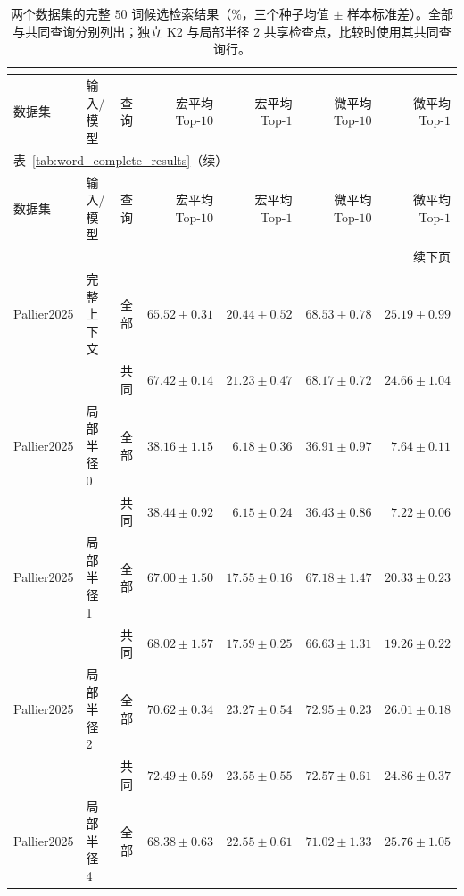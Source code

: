 \begingroup
\papertablestyle
\begin{longtable}{@{}lllrrrr@{}}
\caption{两个数据集的完整 $50$ 词候选检索结果（\%，三个种子均值 $\pm$ 样本标准差）。全部与共同查询分别列出；独立 K2 与局部半径 $2$ 共享检查点，比较时使用其共同查询行。}
\label{tab:word_complete_results}\label{tab:word_complete_pallier}\label{tab:word_complete_chinese}\\
\toprule
数据集 & 输入/模型 & 查询 & \shortstack{宏平均\\Top-$10$} & \shortstack{宏平均\\Top-$1$} & \shortstack{微平均\\Top-$10$} & \shortstack{微平均\\Top-$1$} \\
\midrule
\endfirsthead
\multicolumn{7}{l}{表~\ref{tab:word_complete_results}（续）}\\
\toprule
数据集 & 输入/模型 & 查询 & \shortstack{宏平均\\Top-$10$} & \shortstack{宏平均\\Top-$1$} & \shortstack{微平均\\Top-$10$} & \shortstack{微平均\\Top-$1$} \\
\midrule
\endhead
\midrule\multicolumn{7}{r}{续下页}\\\endfoot
\bottomrule\endlastfoot
Pallier2025 & 完整上下文 & 全部 & $65.52\pm0.31$ & $20.44\pm0.52$ & $68.53\pm0.78$ & $25.19\pm0.99$ \\
 &  & 共同 & $67.42\pm0.14$ & $21.23\pm0.47$ & $68.17\pm0.72$ & $24.66\pm1.04$ \\
\addlinespace
Pallier2025 & 局部半径 0 & 全部 & $38.16\pm1.15$ & $6.18\pm0.36$ & $36.91\pm0.97$ & $7.64\pm0.11$ \\
 &  & 共同 & $38.44\pm0.92$ & $6.15\pm0.24$ & $36.43\pm0.86$ & $7.22\pm0.06$ \\
\addlinespace
Pallier2025 & 局部半径 1 & 全部 & $67.00\pm1.50$ & $17.55\pm0.16$ & $67.18\pm1.47$ & $20.33\pm0.23$ \\
 &  & 共同 & $68.02\pm1.57$ & $17.59\pm0.25$ & $66.63\pm1.31$ & $19.26\pm0.22$ \\
\addlinespace
Pallier2025 & 局部半径 2 & 全部 & $70.62\pm0.34$ & $23.27\pm0.54$ & $72.95\pm0.23$ & $26.01\pm0.18$ \\
 &  & 共同 & $72.49\pm0.59$ & $23.55\pm0.55$ & $72.57\pm0.61$ & $24.86\pm0.37$ \\
\addlinespace
Pallier2025 & 局部半径 4 & 全部 & $68.38\pm0.63$ & $22.55\pm0.61$ & $71.02\pm1.33$ & $25.76\pm1.05$ \\

\end{longtable}
